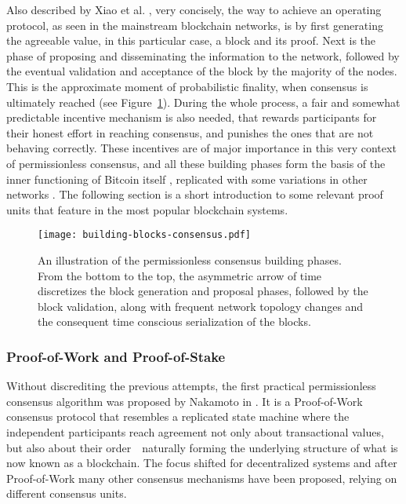 Also described by Xiao et al. \cite{survey-dist-consensus}, very concisely, the way to achieve an operating protocol, as seen in the mainstream blockchain networks, is by first generating the agreeable value, in this particular case, a block and its proof. Next is the phase of proposing and disseminating the information to the network, followed by the eventual validation and acceptance of the block by the majority of the nodes. This is the approximate moment of probabilistic finality, when consensus is ultimately reached (see Figure~\ref{fig:building-blocks-consensus}). During the whole process, a fair and somewhat predictable incentive mechanism is also needed, that rewards participants for their honest effort in reaching consensus, and punishes the ones that are not behaving correctly. These incentives are of major importance in this very context of permissionless consensus, and all these building phases form the basis of the inner functioning of Bitcoin itself \cite{nakamoto2008bitcoin}, replicated with some variations in other networks \cite{buterin2014next, survey-dist-consensus}. The following section is a short introduction to some relevant proof units that feature in the most popular blockchain systems.

\begin{figure}[h!]
  \begin{center}
  \texttt{[image: building-blocks-consensus.pdf]}
  \caption{An illustration of the permissionless consensus building phases. From the bottom to the top, the asymmetric arrow of time discretizes the block generation and proposal phases, followed by the block validation, along with frequent network topology changes and the consequent time conscious serialization of the blocks.}
  \label{fig:building-blocks-consensus}
  \end{center}
\end{figure}

\subsubsection{Proof-of-Work and Proof-of-Stake}

Without discrediting the previous attempts, the first practical permissionless consensus algorithm was proposed by Nakamoto in \cite{nakamoto2008bitcoin}. It is a Proof-of-Work consensus protocol that resembles a replicated state machine where the independent participants reach agreement not only about transactional values, but also about their order~\textemdash~naturally forming the underlying structure of what is now known as a blockchain. The focus shifted for decentralized systems and after Proof-of-Work many other consensus mechanisms have been proposed, relying on different consensus units.

